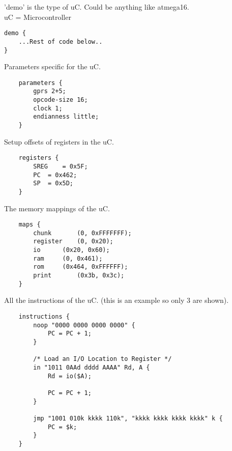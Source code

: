 
\begin{block}{\large {}\vphantom{Example Code}}

\tiny {  
\lstset{
numbers=left,                   %
numberstyle=\tiny,      %
stepnumber=1,
xleftmargin=25pt
}

'demo' is the type of uC. Could be anything like atmega16. \\
uC = Microcontroller
\begin{lstlisting}
demo {
	...Rest of code below..
}
\end{lstlisting}
Parameters specific for the uC.
\begin{lstlisting}
	parameters {
		gprs 2+5;
		opcode-size 16;
		clock 1;
		endianness little;
	}
\end{lstlisting}
Setup offsets of registers in the uC.
\begin{lstlisting}
	registers {
		SREG	= 0x5F;
		PC	= 0x462;
		SP	= 0x5D;
	}
\end{lstlisting}
The memory mappings of the uC.
\begin{lstlisting}
	maps {
		chunk		(0, 0xFFFFFFF);
		register	(0, 0x20);
		io		(0x20, 0x60);
		ram		(0, 0x461);
		rom		(0x464, 0xFFFFFF);
		print		(0x3b, 0x3c);
	}

\end{lstlisting}
All the instructions of the uC. (this is an example so only 3 are shown).
\begin{lstlisting}
	instructions {
		noop "0000 0000 0000 0000" {
			PC = PC + 1;
		}

		/* Load an I/O Location to Register */
		in "1011 0AAd dddd AAAA" Rd, A {
			Rd = io($A);

			PC = PC + 1;
		}

		jmp "1001 010k kkkk 110k", "kkkk kkkk kkkk kkkk" k {
			PC = $k;
		}
	}
  
\end{lstlisting}

}

\end{block}
